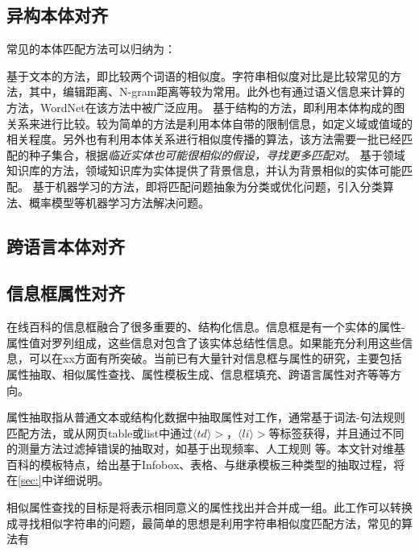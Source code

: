 \subsection{异构本体对齐}
常见的本体匹配方法可以归纳为：

{\heiti 基于文本的方法}，即比较两个词语的相似度。字符串相似度对比是比较常见的方法，其中，编辑距离、N-gram距离等较为常用。此外也有通过语义信息来计算的方法，WordNet\cite{miller1995wordnet}在该方法中被广泛应用。
{\heiti 基于结构的方法\cite{hu2008matching}}，即利用本体构成的图关系来进行比较。较为简单的方法是利用本体自带的限制信息，如定义域或值域的相关程度。另外也有利用本体关系进行相似度传播的算法，该方法需要一批已经匹配的种子集合，根据\textit{临近实体也可能很相似的假设，寻找更多匹配对}。
{\heiti 基于领域知识库的方法\cite{ponzetto2009large,gligorov2007using}}，领域知识库为实体提供了背景信息，并认为背景相似的实体可能匹配。
{\heiti 基于机器学习的方法\cite{niepert2010probabilistic,albagli2012markov}}，即将匹配问题抽象为分类或优化问题，引入分类算法、概率模型等机器学习方法解决问题。


\subsection{跨语言本体对齐}

\subsection{信息框属性对齐}
\label{sec:property-research}
在线百科的信息框融合了很多重要的、结构化信息。信息框是有一个实体的属性-属性值对罗列组成，这些信息对包含了该实体总结性信息。如果能充分利用这些信息，可以在xx方面有所突破。当前已有大量针对信息框与属性的研究，主要包括属性抽取\cite{}、相似属性查找、属性模板生成、信息框填充、跨语言属性对齐等等方向。

{\heiti 属性抽取}指从普通文本或结构化数据中抽取属性对工作，通常基于词法-句法规则匹配方法\cite{pacsca2007role,lee2013attribute}，或从网页table或list中通过$\langle td\rangle>$，$\langle li\rangle>$等标签获得\cite{crestan2010web}，并且通过不同的测量方法过滤掉错误的抽取对，如基于出现频率\cite{pacsca2007role}、人工规则\cite{lee2013attribute} 等。本文针对维基百科的模板特点，给出基于Infobox、表格、与继承模板三种类型的抽取过程，将在\ref{sec:}中详细说明。

{\heiti 相似属性查找}的目标是将表示相同意义的属性找出并合并成一组。此工作可以转换成寻找相似字符串的问题，最简单的思想是利用字符串相似度匹配方法，常见的算法有

